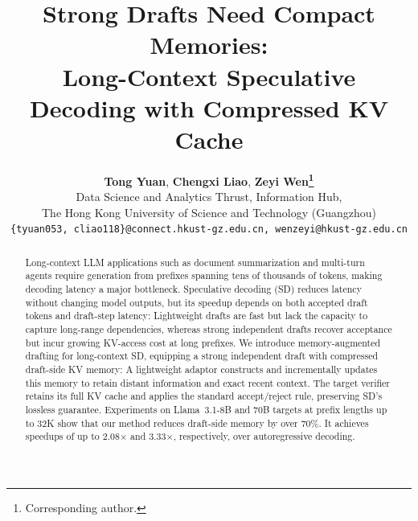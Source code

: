 \documentclass[11pt]{article}
\title{Strong Drafts Need Compact Memories: \\Long-Context Speculative Decoding with Compressed KV Cache}
\author{
  \textbf{Tong Yuan},
  \textbf{Chengxi Liao},
  \textbf{Zeyi Wen\thanks{Corresponding author.}} \\
  Data Science and Analytics Thrust, Information Hub, \\
  The Hong Kong University of Science and Technology (Guangzhou) \\
  \texttt{\{tyuan053, cliao118\}@connect.hkust-gz.edu.cn, wenzeyi@hkust-gz.edu.cn}
}
\begin{document}
\maketitle
\begin{abstract}
Long-context LLM applications such as document summarization and multi-turn agents require generation from prefixes spanning tens of thousands of tokens, making decoding latency a major bottleneck. Speculative decoding (SD) reduces latency without changing model outputs, but its speedup depends on both accepted draft tokens and draft-step latency: Lightweight drafts are fast but lack the capacity to capture long-range dependencies, whereas strong independent drafts recover acceptance but incur growing KV-access cost at long prefixes. We introduce memory-augmented drafting for long-context SD, equipping a strong independent draft with compressed draft-side KV memory: A lightweight adaptor constructs and incrementally updates this memory to retain distant information and exact recent context. The target verifier retains its full KV cache and applies the standard accept/reject rule, preserving SD's lossless guarantee. Experiments on Llama~3.1-8B and 70B targets at prefix lengths up to 32K show that our method reduces draft-side memory by over 70\%. It achieves speedups of up to 2.08$\times$ and 3.33$\times$, respectively, over autoregressive decoding.

\end{abstract}


% 
% 

\newpage


\newpage
\appendix

\end{document}
